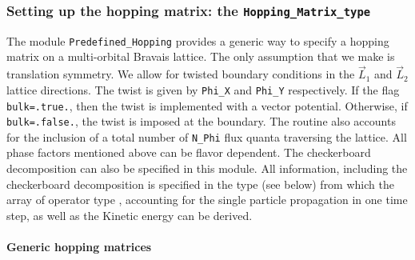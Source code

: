 


\subsubsection{Setting up the hopping matrix: the \texttt{Hopping\_Matrix\_type}}\label{sec:hopping_type}

The module \texttt{Predefined\_Hopping}   provides a   generic way to   specify a  hopping matrix on a  multi-orbital   Bravais lattice.  The only  assumption that we make is  translation symmetry.   We   allow  for twisted  boundary conditions in the $\vec{L}_1$ and $\vec{L}_2$ lattice directions. The twist is given by  \texttt{Phi\_X}  and \texttt{Phi\_Y}  respectively.  If the flag  \texttt{bulk=.true.}, then the twist is implemented with a vector potential. Otherwise, if  \texttt{bulk=.false.}, the twist is imposed at the boundary. The routine also accounts for  the inclusion of a  total number of \texttt{N\_Phi}  flux quanta traversing the lattice.  All phase factors mentioned above can be flavor dependent.   The checkerboard decomposition can also be specified in this module.      All information, including the checkerboard decomposition is specified in the     type (see below) from which  the array of  operator type ,   accounting for the single particle propagation in one time step,  as well as the Kinetic energy can be derived.    

\paragraph*{Generic hopping matrices}\label{sec:generic_hopping}

\\

